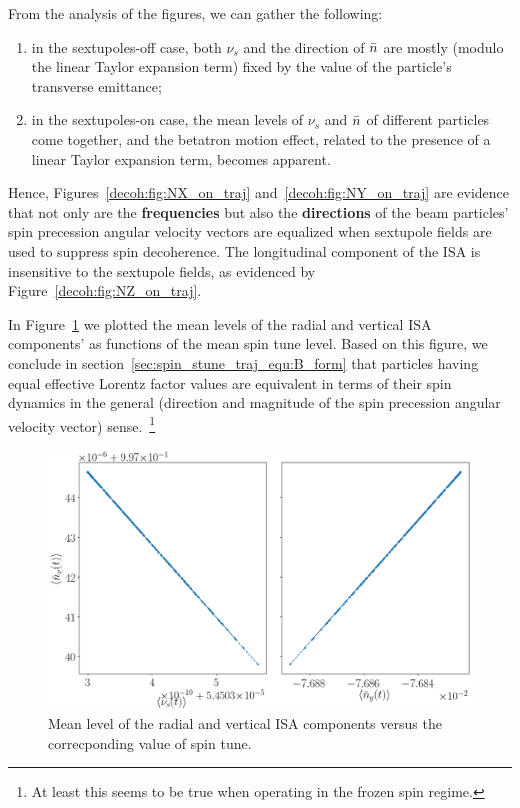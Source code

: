 From the analysis of the figures, we can gather the following:
\begin{enumerate}
\item in the sextupoles-off case, both $\nu_s$ and the direction of $\bar n$ are mostly (modulo the
  linear Taylor expansion term) fixed by the value of the particle's transverse emittance;
\item in the sextupoles-on case, the mean levels of $\nu_s$ and $\bar n$ of different particles come
  together, and the betatron motion effect, related to the presence of a linear Taylor expansion term,
  becomes apparent.
\end{enumerate}
Hence, Figures~\ref{decoh:fig:NX_on_traj} and~\ref{decoh:fig:NY_on_traj} are evidence that not only are the
\textbf{frequencies} but also the \textbf{directions} of the beam particles' spin precession angular
velocity vectors are equalized when sextupole fields are used to suppress spin decoherence. The
longitudinal component of the ISA is insensitive to the sextupole fields, as evidenced
by Figure~\ref{decoh:fig:NZ_on_traj}.

In Figure~\ref{decoh:fig:nbar_vs_ST} we plotted the mean levels of the radial and vertical ISA components'
as functions of the mean spin tune level. Based on this figure, we conclude
in section~\ref{sec:spin_stune_traj_equ:B_form} that particles having equal effective Lorentz factor values
are equivalent in terms of their spin dynamics in the general (direction and magnitude of the spin precession
angular velocity vector) sense.~\footnote{At least this seems to be true when operating
  in the frozen spin regime.}
\begin{figure}[!h]
	\centering
	\includegraphics[width=\linewidth]{images/decoh_sim/mean_n_bar_vs_spin_tune}
	\caption{Mean level of the radial and vertical ISA components versus the correcponding
          value of spin tune.\label{decoh:fig:nbar_vs_ST}}
\end{figure}

